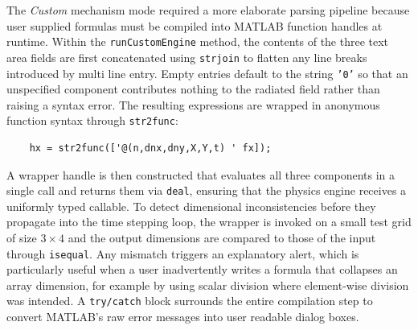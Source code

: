 \documentclass[12pt]{final_project_report}
\begin{document}
The \textit{Custom} mechanism mode required a more elaborate parsing pipeline because user supplied formulas must be compiled into MATLAB function handles at runtime. Within the \texttt{runCustomEngine} method, the contents of the three text area fields are first concatenated using \texttt{strjoin} to flatten any line breaks introduced by multi line entry. Empty entries default to the string \texttt{'0'} so that an unspecified component contributes nothing to the radiated field rather than raising a syntax error. The resulting expressions are wrapped in anonymous function syntax through \texttt{str2func}:
\begin{verbatim}
    hx = str2func(['@(n,dnx,dny,X,Y,t) ' fx]);
\end{verbatim}
A wrapper handle is then constructed that evaluates all three components in a single call and returns them via \texttt{deal}, ensuring that the physics engine receives a uniformly typed callable. To detect dimensional inconsistencies before they propagate into the time stepping loop, the wrapper is invoked on a small test grid of size $3 \times 4$ and the output dimensions are compared to those of the input through \texttt{isequal}. Any mismatch triggers an explanatory alert, which is particularly useful when a user inadvertently writes a formula that collapses an array dimension, for example by using scalar division where element-wise division was intended. A \texttt{try/catch} block surrounds the entire compilation step to convert MATLAB's raw error messages into user readable dialog boxes.
\end{document}
